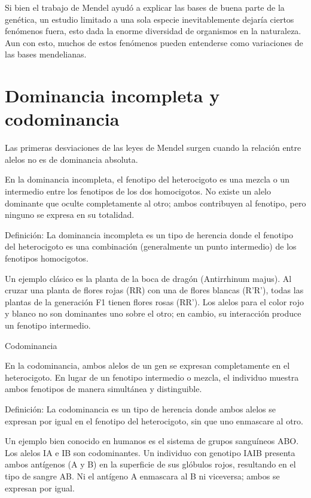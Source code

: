 

Si bien el trabajo de Mendel ayudó a explicar las bases de buena parte de la genética, un estudio limitado a una sola especie inevitablemente dejaría ciertos fenómenos fuera, esto dada la enorme diversidad de organismos en la naturaleza. Aun con esto, muchos de estos fenómenos pueden entenderse como variaciones de las bases mendelianas.

\section{Dominancia incompleta y codominancia}

Las primeras desviaciones de las leyes de Mendel surgen cuando la relación entre alelos no es de dominancia absoluta.

En la dominancia incompleta, el fenotipo del heterocigoto es una mezcla o un intermedio entre los fenotipos de los dos homocigotos. No existe un alelo dominante que oculte completamente al otro; ambos contribuyen al fenotipo, pero ninguno se expresa en su totalidad.

Definición: La dominancia incompleta es un tipo de herencia donde el fenotipo del heterocigoto es una combinación (generalmente un punto intermedio) de los fenotipos homocigotos.

Un ejemplo clásico es la planta de la boca de dragón (Antirrhinum majus). Al cruzar una planta de flores rojas (RR) con una de flores blancas (R'R'), todas las plantas de la generación F1 tienen flores rosas (RR'). Los alelos para el color rojo y blanco no son dominantes uno sobre el otro; en cambio, su interacción produce un fenotipo intermedio.

Codominancia

En la codominancia, ambos alelos de un gen se expresan completamente en el heterocigoto. En lugar de un fenotipo intermedio o mezcla, el individuo muestra ambos fenotipos de manera simultánea y distinguible.

Definición: La codominancia es un tipo de herencia donde ambos alelos se expresan por igual en el fenotipo del heterocigoto, sin que uno enmascare al otro.

Un ejemplo bien conocido en humanos es el sistema de grupos sanguíneos ABO. Los alelos IA e IB son codominantes. Un individuo con genotipo IAIB presenta ambos antígenos (A y B) en la superficie de sus glóbulos rojos, resultando en el tipo de sangre AB. Ni el antígeno A enmascara al B ni viceversa; ambos se expresan por igual.

